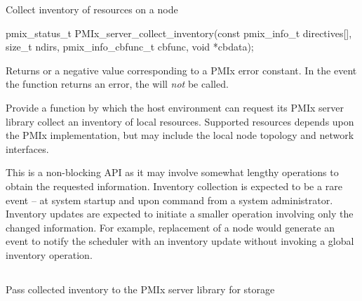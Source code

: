 Collect inventory of resources on a node

\format

\cspecificstart
\begin{codepar}
pmix_status_t
PMIx_server_collect_inventory(const pmix_info_t directives[],
                              size_t ndirs,
                              pmix_info_cbfunc_t cbfunc,
                              void *cbdata);
\end{codepar}
\cspecificend

\begin{arglist}
\end{arglist}

Returns  or a negative value corresponding to a PMIx error constant. In the event the function returns an error, the  will \textit{not} be called.

\descr

Provide a function by which the host environment can request its \ac{PMIx} server library collect an inventory of local resources. Supported resources depends upon the \ac{PMIx} implementation, but may include the local node topology and network interfaces.

\advicermstart
This is a non-blocking \ac{API} as it may involve somewhat lengthy operations to obtain the requested information. Inventory collection is expected to be a rare event – at system startup and upon command from a system administrator. Inventory updates are expected to initiate a smaller operation involving only the changed information. For example, replacement of a node would generate an event to notify the scheduler with an inventory update without invoking a global inventory operation.
\advicermend

\subsection{}

\summary

Pass collected inventory to the \ac{PMIx} server library for storage

